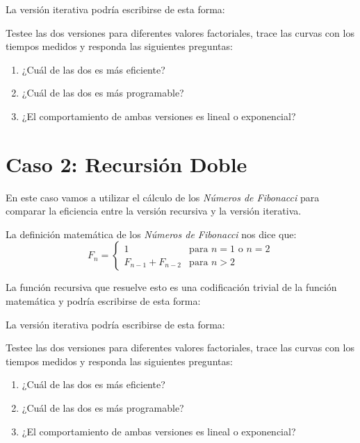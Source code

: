 \documentclass[a4paper,11pt]{article}
\begin{document}


La versión iterativa podría escribirse de esta forma:



Testee las dos versiones para diferentes valores factoriales, trace las curvas con los
tiempos medidos y responda las siguientes preguntas:
\begin{enumerate}
    \item ¿Cuál de las dos es más eficiente?
    \item ¿Cuál de las dos es más programable?
    \item ¿El comportamiento de ambas versiones es lineal o exponencial?
\end{enumerate}


\section*{Caso 2: Recursión Doble}

En este caso vamos a utilizar el cálculo de los \emph{Números de Fibonacci}
para comparar la eficiencia entre la versión recursiva y la versión iterativa.

La definición matemática de los \emph{Números de Fibonacci} nos dice que:
\begin{equation*}
    F_n = \left\{ \begin{array}{ll}
        1                & \text{para } n = 1 \text{ o } n = 2 \\
        F_{n-1} + F_{n-2} & \text{para } n > 2
    \end{array} \right.
\end{equation*}

La función recursiva que resuelve esto es una codificación trivial de la función matemática y podría escribirse de esta forma:



La versión iterativa podría escribirse de esta forma:



Testee las dos versiones para diferentes valores factoriales, trace las curvas con los
tiempos medidos y responda las siguientes preguntas:
\begin{enumerate}
    \item ¿Cuál de las dos es más eficiente?
    \item ¿Cuál de las dos es más programable?
    \item ¿El comportamiento de ambas versiones es lineal o exponencial?
\end{enumerate}
\end{document}
